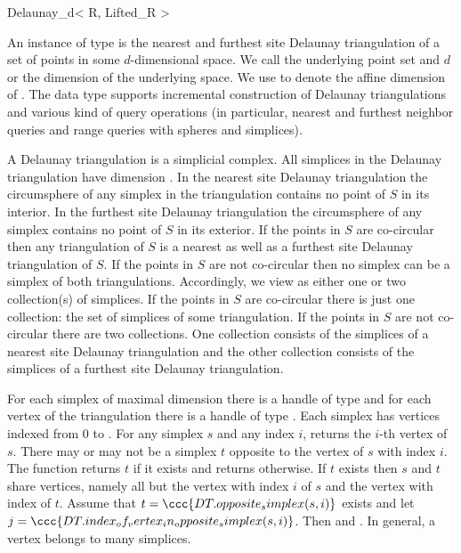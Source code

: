
\begin{ccRefClass}{Delaunay_d< R, Lifted_R >}

\ccDefinition

An instance  of type  is the
nearest and furthest site Delaunay triangulation of a set  of
points in some $d$-dimensional space. We call  the underlying
point set and $d$ or  the dimension of the underlying space.
We use  to denote the affine dimension of .  The data
type supports incremental construction of Delaunay triangulations and
various kind of query operations (in particular, nearest and furthest
neighbor queries and range queries with spheres and simplices).

A Delaunay triangulation is a simplicial complex. All simplices in
the Delaunay triangulation have dimension .  In the nearest
site Delaunay triangulation the circumsphere of any simplex in the
triangulation contains no point of $S$ in its interior. In the
furthest site Delaunay triangulation the circumsphere of any simplex
contains no point of $S$ in its exterior. If the points in $S$ are
co-circular then any triangulation of $S$ is a nearest as well as a
furthest site Delaunay triangulation of $S$. If the points in $S$ are
not co-circular then no simplex can be a simplex of both
triangulations. Accordingly, we view  as either one or two
collection(s) of simplices. If the points in $S$ are co-circular there
is just one collection: the set of simplices of some triangulation.
If the points in $S$ are not co-circular there are two
collections. One collection consists of the simplices of a nearest
site Delaunay triangulation and the other collection consists of the
simplices of a furthest site Delaunay triangulation.

For each simplex of maximal dimension there is a handle of type
 and for each vertex of the triangulation there is
a handle of type . Each simplex has 
vertices indexed from $0$ to .  For any simplex $s$ and any
index $i$,  returns the $i$-th vertex of
$s$. There may or may not be a simplex $t$ opposite to the vertex of
$s$ with index $i$.  The function 
returns $t$ if it exists and returns 
otherwise. If $t$ exists then $s$ and $t$ share  vertices,
namely all but the vertex with index $i$ of $s$ and the vertex with
index  of $t$.
Assume that $t = \ccc{DT.opposite_simplex(s,i)}$ exists and let $j =
\ccc{DT.index_of_vertex_in_opposite_simplex(s,i)}$. Then  and .  In general, a vertex
belongs to many simplices.


\end{ccRefClass}
